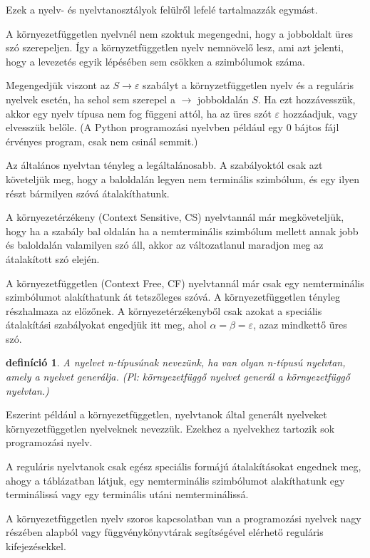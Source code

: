 \documentclass[a4paper]{article}
\newtheorem{definicio}{definíció}[section]
\begin{document}
Ezek a nyelv- és nyelvtanosztályok felülről lefelé tartalmazzák egymást.

A környezetfüggetlen nyelvnél nem szoktuk megengedni, hogy a jobboldalt
üres szó szerepeljen. Így a környzetfüggetlen nyelv nemnövelő lesz, ami
azt jelenti, hogy a levezetés egyik lépésében sem csökken a szimbólumok
száma.

Megengedjük viszont az $S\to \varepsilon$ szabályt a környzetfüggetlen
nyelv és a reguláris nyelvek esetén, ha sehol sem szerepel a $\to$
jobboldalán $S$. Ha ezt hozzávesszük, akkor egy nyelv típusa nem fog
függeni attól, ha az üres szót $\varepsilon$ hozzáadjuk, vagy elvesszük
belőle. (A Python programozási nyelvben például egy 0 bájtos fájl
érvényes program, csak nem csinál semmit.)

Az általános nyelvtan tényleg a legáltalánosabb. A
szabályoktól csak azt követeljük meg, hogy a baloldalán legyen nem
terminális szimbólum, és egy ilyen részt bármilyen szóvá átalakíthatunk.

A környezetérzékeny (Context Sensitive, CS) nyelvtannál már
megköveteljük, hogy ha a szabály bal oldalán ha a nemterminális
szimbólum mellett annak jobb és baloldalán valamilyen szó áll, akkor az
változatlanul maradjon meg az átalakított szó elején.

A környezetfüggetlen (Context Free, CF) nyelvtannál már csak
egy nemterminális szimbólumot alakíthatunk át tetszőleges szóvá. A
környezetfüggetlen tényleg részhalmaza az előzőnek.  A
környezetérzékenyből csak azokat a speciális átalakítási szabályokat
engedjük itt meg, ahol $\alpha=\beta=\varepsilon$, azaz mindkettő üres
szó.


\begin{definicio}
A nyelvet n-típusúnak nevezünk, ha van olyan n-típusú
nyelvtan, amely a nyelvet generálja. (Pl: környezetfüggő nyelvet generál
a környezetfüggő nyelvtan.)
\end{definicio}

Eszerint például a környezetfüggetlen, nyelvtanok által generált
nyelveket környezetfüggetlen nyelveknek nevezzük. Ezekhez a nyelvekhez
tartozik sok programozási nyelv.

A reguláris nyelvtanok csak egész speciális formájú átalakításokat
engednek meg, ahogy a táblázatban látjuk, egy nemterminális szimbólumot
alakíthatunk egy terminálissá vagy egy terminális utáni nemterminálissá.

A környezetfüggetlen nyelv szoros kapcsolatban van a programozási
nyelvek nagy részében alapból vagy függvénykönyvtárak segítségével
elérhető reguláris kifejezésekkel.
\end{document}
